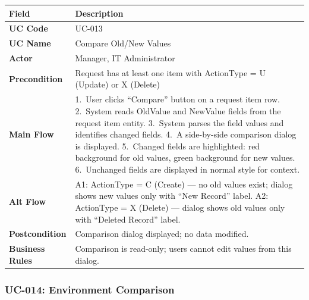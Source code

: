 \documentclass[12pt,a4paper]{report}
\begin{document}
\begin{longtable}{|>{\bfseries}p{2.8cm}|p{12cm}|}
  \hline
  \rowcolor{tableheadpeach}
  \textbf{Field} & \textbf{Description} \\ \hline
  \endhead \hline \endfoot
  UC Code       & UC-013 \\ \hline
  UC Name       & Compare Old/New Values \\ \hline
  Actor         & Manager, IT Administrator \\ \hline
  Precondition  & Request has at least one item with ActionType = U (Update) or X (Delete) \\ \hline
  Main Flow     & 1.~User clicks ``Compare'' button on a request item row.
                  2.~System reads OldValue and NewValue fields from the request item entity.
                  3.~System parses the field values and identifies changed fields.
                  4.~A side-by-side comparison dialog is displayed.
                  5.~Changed fields are highlighted: red background for old values, green background for new values.
                  6.~Unchanged fields are displayed in normal style for context. \\ \hline
  Alt Flow      & A1: ActionType = C (Create) --- no old values exist; dialog shows new values only with ``New Record'' label.
                  A2: ActionType = X (Delete) --- dialog shows old values only with ``Deleted Record'' label. \\ \hline
  Postcondition & Comparison dialog displayed; no data modified. \\ \hline
  Business Rules& Comparison is read-only; users cannot edit values from this dialog. \\ \hline
\end{longtable}

\subsubsection{UC-014: Environment Comparison}
\end{document}
